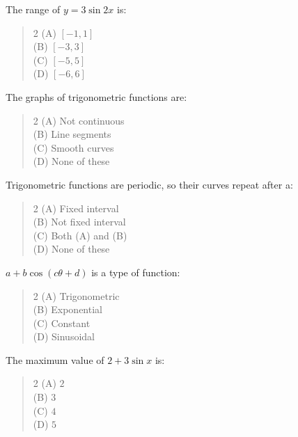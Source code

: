 \documentclass[11pt,a4paper]{article}
\begin{document}
\begin{mcqlist}
\item The range of $y=3\sin2x$ is:
\begin{quote}\begin{multicols}{2}
\noindent (A) $[-1,1]$ \\
(B) $[-3,3]$ \\
(C) $[-5,5]$ \\
(D) $[-6,6]$
\end{multicols}\end{quote}

\item The graphs of trigonometric functions are:
\begin{quote}\begin{multicols}{2}
\noindent (A) Not continuous \\
(B) Line segments \\
(C) Smooth curves \\
(D) None of these
\end{multicols}\end{quote}

\item Trigonometric functions are periodic, so their curves repeat after a:
\begin{quote}\begin{multicols}{2}
\noindent (A) Fixed interval \\
(B) Not fixed interval \\
(C) Both (A) and (B) \\
(D) None of these
\end{multicols}\end{quote}

\item $a+b\cos(c\theta+d)$ is a type of \underline{\hspace{1.5cm}} function:
\begin{quote}\begin{multicols}{2}
\noindent (A) Trigonometric \\
(B) Exponential \\
(C) Constant \\
(D) Sinusoidal
\end{multicols}\end{quote}

\item The maximum value of $2+3\sin x$ is:
\begin{quote}\begin{multicols}{2}
\noindent (A) $2$ \\
(B) $3$ \\
(C) $4$ \\
(D) $5$
\end{multicols}\end{quote}


\end{mcqlist}
\end{document}
